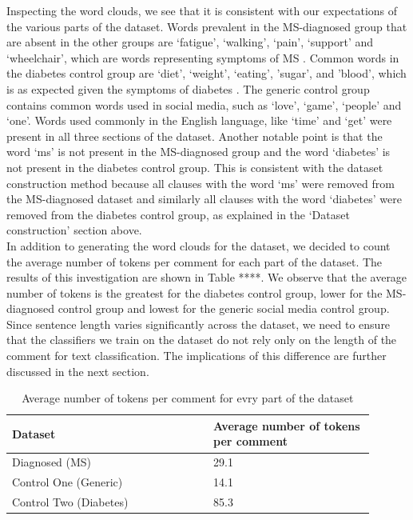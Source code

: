 \documentclass[11pt,a4paper]{article}
\begin{document}
\indent Inspecting the word clouds, we see that it is consistent with our expectations of the various parts of the dataset. Words prevalent in the MS-diagnosed group that are absent in the other groups are ‘fatigue’, ‘walking’, ‘pain’, ‘support’ and ‘wheelchair’, which are words representing symptoms of MS \citep{Gustavsen:21}. Common words in the diabetes control group are ‘diet’, ‘weight’, ‘eating’, 'sugar', and 'blood', which is as expected given the symptoms of diabetes \citep{Ramachandran:14}. The generic control group contains common words used in social media, such as ‘love’, ‘game’, ‘people’ and ‘one’. Words used commonly in the English language, like ‘time’ and ‘get’ were present in all three sections of the dataset. Another notable point is that the word ‘ms’ is not present in the MS-diagnosed group and the word ‘diabetes’ is not present in the diabetes control group. This is consistent with the dataset construction method because all clauses with the word ‘ms’ were removed from the MS-diagnosed dataset and similarly all clauses with the word ‘diabetes’ were removed from the diabetes control group, as explained in the ‘Dataset construction’ section above. \\
\indent In addition to generating the word clouds for the dataset, we decided to count the average number of tokens per comment for each part of the dataset. The results of this investigation are shown in Table ****. We observe that the average number of tokens is the greatest for the diabetes control group, lower for the MS-diagnosed control group and lowest for the generic social media control group. Since sentence length varies significantly across the dataset, we need to ensure that the classifiers we train on the dataset do not rely only on the length of the comment for text classification. The implications of this difference are further discussed in the next section.
\begin{table}
\centering
\begin{tabular}{p{0.5\linewidth}p{0.4\linewidth}}
\hline
\textbf{Dataset} & \textbf{Average number of tokens per comment}\\
\hline
Diagnosed (MS) & {29.1} \\
Control One (Generic) & {14.1} \\
Control Two (Diabetes) & {85.3} \\ 
\hline
\end{tabular}
\caption{Average number of tokens per comment for evry part of the dataset}
\label{tab:}
\end{table}
\end{document}
